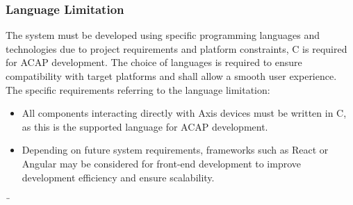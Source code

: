 \documentclass{article}
\begin{document}
\subsubsection{Language Limitation}
The system must be developed using specific programming languages and technologies due to project requirements and platform constraints, C is required for ACAP development. The choice of languages is required to ensure compatibility with target platforms and shall allow a smooth user experience. The specific requirements referring to the language limitation:

\begin{itemize}
    \item 
All components interacting directly with Axis devices must be written in C, as this is the supported language for ACAP development.
    \item 
Depending on future system requirements, frameworks such as React or Angular may be considered for front-end development to improve development efficiency and ensure scalability.
\end{itemize}

\newpage
¨%



\printbibliography
\end{document}
